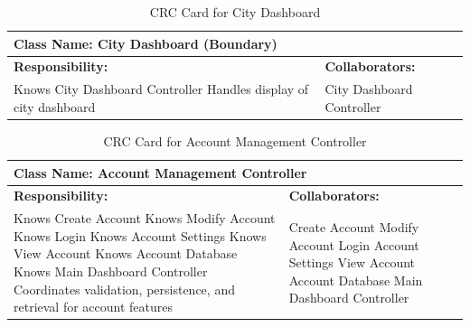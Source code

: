 \documentclass[]{article}
\begin{document}
\begin{table}[H]
    \centering
    \caption{CRC Card for City Dashboard}
    \vspace{1mm}
    \begin{tabular}{|p{7.5cm}|p{7.5cm}|}
    \hline 
      \multicolumn{2}{|l|}{\textbf{Class Name: City Dashboard (Boundary)}} \\
    \hline
    \textbf{Responsibility:} & \textbf{Collaborators:} \\
    \hline
    Knows City Dashboard Controller \newline
    Handles display of city dashboard \newline
    & 
    City Dashboard Controller \\
    \hline
    \end{tabular}
\end{table}   
\begin{table}[H]
    \centering
    \caption{CRC Card for Account Management Controller}
    \vspace{1mm}
    \begin{tabular}{|p{7.5cm}|p{7.5cm}|}
    \hline 
    \multicolumn{2}{|l|}{\textbf{Class Name: Account Management Controller}} \\
    \hline
    \textbf{Responsibility:} & \textbf{Collaborators:} \\
    \hline
        Knows Create Account \newline
        Knows Modify Account \newline
        Knows Login \newline
        Knows Account Settings \newline
        Knows View Account \newline
        Knows Account Database \newline
        Knows Main Dashboard Controller \newline
        Coordinates validation, persistence, and retrieval for account features \newline
        &
        Create Account \newline
        Modify Account \newline
        Login \newline
        Account Settings \newline
        View Account \newline
        Account Database \newline
        Main Dashboard Controller \\
    \hline
    \end{tabular}
\end{table}
\end{document}
